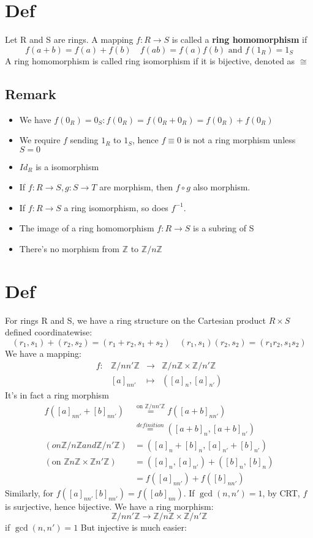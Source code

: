 \documentclass{book}
\begin{document}
\section{Def}Let R and S are rings. A mapping $f:R\rightarrow S$ is called a \textbf{ring homomorphism} if $$f(a+b)=f(a)+f(b)\quad f(ab)=f(a)f(b)\text{ and }f(1_R)=1_S$$ 
A ring homomorphism is called ring isomorphism if it is bijective, denoted as $\cong$
\subsection*{Remark}
\begin{itemize}
	\item We have $f(0_R)=0_S:f(0_R)=f(0_R+0_R)=f(0_R)+f(0_R)$
	\item We require $f$ sending $1_R$ to $1_S$, hence $f\equiv 0$ is not a ring morphism unless $S=0$
	\item $Id_R$ is a isomorphism 
	\item If $f:R\rightarrow S,g:S\rightarrow T$ are morphism, then $f\circ g$ also morphism.
	\item If $f:R\rightarrow S$ a ring isomorphism, so does $f^{-1}$.
	\item The image of a ring homomorphism $f:R\rightarrow S$ is a subring of S
	\item There's no morphism from $\mathbb Z$ to $\mathbb Z/n\mathbb Z$
\end{itemize}
\section{Def}
For rings R and S, we have a ring structure on the Cartesian product $R\times S$ defined coordinatewise:
$$(r_1,s_1)+(r_2,s_2)=(r_1+r_2,s_1+s_2)\quad (r_1,s_1)(r_2,s_2)=(r_1r_2,s_1s_2) $$
We have a mapping:
$$\begin{aligned}
	f:&\mathbb Z/nn'\mathbb Z&\rightarrow&\mathbb Z/n\mathbb Z\times\mathbb Z/n'\mathbb Z\\
	&[a]_{nn'}&\mapsto&([a]_n,[a]_{n'})
\end{aligned}$$It's in fact a ring morphism
$$
\begin{aligned}
	f([a]_{nn'}+[b]_{nn'})&\stackrel{\text{on }\mathbb Z/nn'\mathbb Z}{=}f([a+b]_{nn'})\\
	&\stackrel{definition}{=}([a+b]_n,[a+b]_{n'})\\
	(on \mathbb Z/n\mathbb Z and \mathbb Z/n'\mathbb Z)&=([a]_n+[b]_n,[a]_{n'}+[b]_{n'})\\
	(\text{on }\mathbb Zn\mathbb Z\times\mathbb Zn'\mathbb Z)&=([a]_n,[a]_{n'})+([b]_n,[b]_{n})\\
	&=f([a]_{nn'})+f([b]_{nn'})
\end{aligned}$$
Similarly, for $f([a]_{nn'}[b]_{nn'})=f([ab]_{nn})$. If $\gcd(n,n')=1$, by CRT, $f$ is surjective, hence bijective. We have a ring morphism:
$$\mathbb Z/nn'\mathbb Z\rightarrow \mathbb Z/n\mathbb Z\times\mathbb Z/n'\mathbb Z$$ if $\gcd(n,n')=1$
But injective is much easier:
\end{document}
